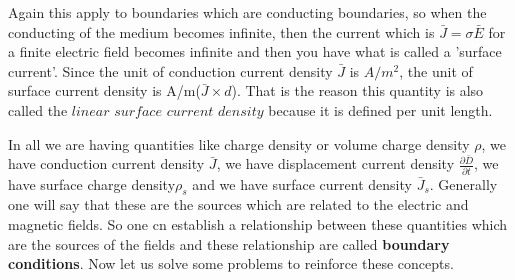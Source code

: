  
 Again this apply to boundaries which are conducting boundaries, so when the conducting of the medium becomes infinite, then the current which is $\bar{J}=\sigma\bar{E}$ for a finite electric field becomes infinite and then you have what is called a 'surface current'. Since the unit of conduction current density $\bar{J}$ is $A/m^{2}$, the unit of surface current density is A/m($\bar{J}\times d$). That is the reason this quantity is also called the $linear$ $surface$ $current$ $density$ because it is defined per unit length.
 
 
 In all we are having quantities like charge density or volume charge density $\rho$, we have conduction current density $\bar{J}$, we have displacement current density $\frac{\partial\bar{D}}{\partial t}$, we have surface charge density$\rho_{s}$ and we have surface current density $\bar{J}_{s}$. Generally one will say that these are the sources which are related to the electric and magnetic fields. So one cn establish a relationship between these quantities which are the sources of the fields and these relationship are called \textbf{ boundary conditions}. Now let us solve some problems to reinforce these concepts.\\
 
